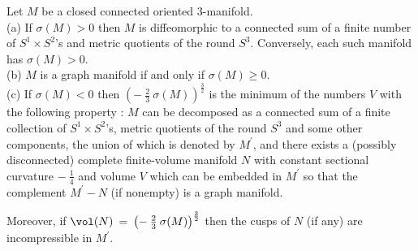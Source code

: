 \begin{proposition}
  \label{prop:kl-alternative-proof-cusp-incompressibility-characterization-graph-manifolds}
 \label{propYamabe}
Let $M$ be a closed connected oriented $3$-manifold. \\
(a) If $\sigma(M) > 0$ then $M$ is
diffeomorphic to a connected sum of a finite number of
$S^1 \times S^2$'s and metric quotients of the round $S^3$.
Conversely, each such manifold has $\sigma(M) > 0$. \\
(b) $M$ is a graph manifold if and only if $\sigma(M)
\ge 0$. \\
(c) If $\sigma(M) < 0$
 then
$\left( - \: \frac23 \: \sigma(M)
\right)^{\frac32}$ is the minimum
of the numbers
$V$ with the following property : $M$ can be decomposed as a connected sum
of a finite collection of $S^1 \times S^2$'s, metric quotients of the round
$S^3$ and some other components, the union of which is denoted by
$M^\prime$, and there exists a (possibly disconnected) complete
finite-volume
manifold $N$ with constant sectional curvature $- \: \frac14$ and
volume $V$ which can be embedded in $M^\prime$ so that the
complement $M^\prime - N$ (if nonempty) is a graph manifold.

Moreover, if
$\vol(N) \: = \: \left( - \: \frac23 \: \sigma(M)
\right)^{\frac32}$
then the
cusps of $N$ (if any) are incompressible in $M^\prime$.
\end{proposition}


